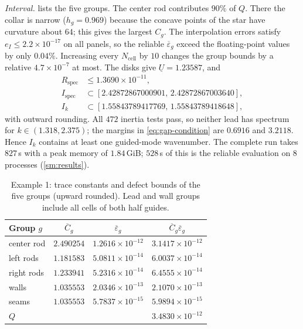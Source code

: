 \emph{Interval.}  lists the five groups. The center rod
contributes $90\%$ of $Q$. There the collar is narrow ($h_g=0.969$) because the
concave points of the star have curvature about $64$; this gives the largest
$C_g$. The interpolation errors satisfy $e_I\le2.2\times10^{-17}$ on all panels, so
the reliable $\overline\varepsilon_g$ exceed the floating-point values by
only $0.04\%$. Increasing every $N_{\mathrm{cell}}$ by $10$ changes the group bounds by a
relative $4.7\times10^{-7}$ at most. The disks give $\underline U=1.23587$, and
\begin{align*}
  R_{\mathrm{spec}}&\le1.3690\times10^{-11},\\
  I_{\mathrm{spec}}&\subset[2.42872867000901,\,2.42872867003640],\\
  I_k&\subset[1.55843789417769,\,1.55843789418648],
\end{align*}
with outward rounding. All $472$ inertia tests pass, so neither lead has spectrum
for $k\in(1.318,2.375)$; the margins in \eqref{eq:gap-condition} are $0.6916$ and
$3.2118$. Hence $I_k$ contains at least one guided-mode wavenumber. The complete
run takes $827$\,s with a peak memory of $1.84$\,GiB; $528$\,s of this is the
reliable evaluation on $8$ processes (\cref{sm:results}).

\begin{table}[tbhp]
\caption{Example 1: trace constants and defect bounds of the five groups (upward
rounded). Lead and wall groups include all cells of both half guides.}
\label{tab:ex1}
\centering\small
\begin{tabular}{lccc}
\toprule
Group $g$ & $\overline C_g$ & $\overline\varepsilon_g$ & $\overline C_g\overline\varepsilon_g$\\
\midrule
center rod & $2.490254$ & $1.2616\times10^{-12}$ & $3.1417\times10^{-12}$\\
left rods & $1.181583$ & $5.0811\times10^{-14}$ & $6.0037\times10^{-14}$\\
right rods & $1.233941$ & $5.2316\times10^{-14}$ & $6.4555\times10^{-14}$\\
walls & $1.035553$ & $2.0346\times10^{-13}$ & $2.1070\times10^{-13}$\\
seams & $1.035553$ & $5.7837\times10^{-15}$ & $5.9894\times10^{-15}$\\
\midrule
$Q$ & & & $3.4830\times10^{-12}$\\
\bottomrule
\end{tabular}
\end{table}

